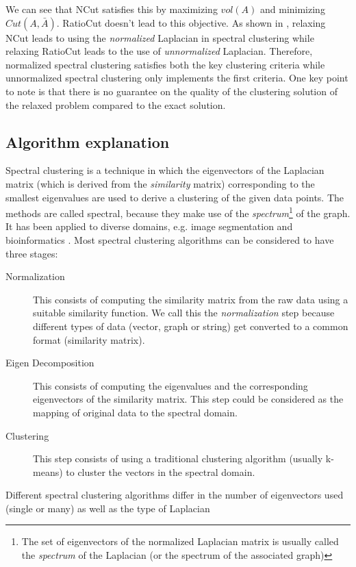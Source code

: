 We can see that NCut satisfies this by maximizing $vol(A)$ and minimizing $Cut(A,\bar{A})$. RatioCut doesn't lead to this objective. As shown in \citet{luxberg2006tutorial_spectral}, relaxing NCut leads to using the \textit{normalized} Laplacian in spectral clustering while relaxing RatioCut leads to the use of \textit{unnormalized} Laplacian. Therefore, normalized spectral clustering satisfies both the key clustering criteria while unnormalized spectral clustering only implements the first criteria. One key point to note is that there is no guarantee on the quality of the clustering solution of the relaxed problem compared to the exact solution. 

\subsection{Algorithm explanation}
Spectral clustering is a technique in which the eigenvectors of the Laplacian matrix (which is derived from the \textit{similarity} matrix) corresponding to 
the smallest eigenvalues are used to derive a clustering of the given data points. The methods are called spectral, because 
they make use of the \textit{spectrum}\footnote{The set of eigenvectors of the normalized Laplacian matrix is usually called 
the \textit{spectrum} of the Laplacian (or the spectrum of the associated graph)} of the graph. It has been applied to diverse 
domains, e.g. image segmentation \citep{shi00normalized, weiss1999segmentation} and bioinformatics \citep{speer05spectral}. Most spectral clustering algorithms 
can be considered to have three stages:
\begin{description}
    \item[Normalization] This consists of computing the similarity matrix from the raw data using a suitable similarity function. We call this the \textit{normalization} step because different types of data (vector, graph or string) get converted to a common format (similarity matrix).
    \item[Eigen Decomposition] This consists of computing the eigenvalues and the corresponding eigenvectors of the similarity matrix. This step could be considered as the mapping of original data to the spectral domain.
    \item[Clustering] This step consists of using a traditional clustering algorithm (usually k-means) to cluster the vectors in the spectral domain.	
\end{description}
Different spectral clustering algorithms differ in the number of eigenvectors used (single or many) as well as the type of Laplacian 
